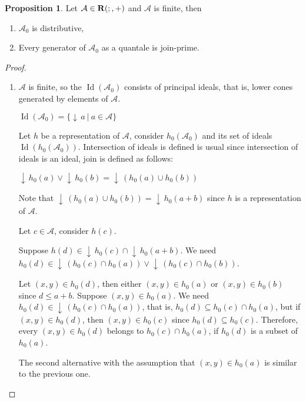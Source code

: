 \documentclass[a4paper]{article}
\theoremstyle{definition}
\theoremstyle{theorem}
\theoremstyle{proposition}
\newtheorem{proposition}{Proposition}
\theoremstyle{lemma}
\theoremstyle{ex}
\theoremstyle{corollary}
\theoremstyle{claim}
\newcommand{\down}[1]{\ensuremath{{\downarrow}\,#1}}
\begin{document}
\begin{proposition} \label{distr}
  Let $\mathcal{A} \in {\bf R}(;,+)$ and $\mathcal{A}$ is finite, then
  \begin{enumerate}
    \item $\mathcal{A}_0$ is distributive,
    \item Every generator of $\mathcal{A}_0$ as a quantale is join-prime.
  \end{enumerate}
\end{proposition}

\begin{proof}
$ $

  \begin{enumerate}
    \item
    $\mathcal{A}$ is finite, so the $\operatorname{Id}(\mathcal{A}_0)$ consists of principal ideals, that is, lower cones generated by elements of $\mathcal{A}$.

    \begin{center}
    $\operatorname{Id}(\mathcal{A}_0) = \{ \down{a} \: | \: a \in \mathcal{A} \}$
    \end{center}

    Let $h$ be a representation of $\mathcal{A}$, consider $h_0(\mathcal{A}_0)$ and its set of ideals $\operatorname{Id}(h_0(\mathcal{A}_0))$. Intersection of ideals is defined is usual since intersection of ideals is an ideal, join is defined as follows:

    \begin{center}
    $\down{h_0(a)} \vee \down{h_0(b)} = \down{(h_0(a) \cup h_0(b))}$
    \end{center}
    Note that $\down{(h_0(a) \cup h_0(b))} = \down{h_0(a + b)}$ since $h$ is a representation of $\mathcal{A}$.

    Let $c \in \mathcal{A}$, consider $h(c)$.

    Suppose $h(d) \in \down{h_0(c)} \cap \down{h_0(a + b)}$. We need $h_0(d) \in \down{(h_0(c) \cap h_0(a))} \vee \down{(h_0(c) \cap h_0(b))}$.


    Let $(x, y) \in h_0(d)$, then either $(x, y) \in h_0(a)$ or $(x, y) \in h_0(b)$ since $d \leq a + b$.
    Suppose $(x, y) \in h_0(a)$. We need $h_0(d) \in \down{(h_0(c) \cap h_0(a))}$, that is, $h_0(d) \subseteq h_0(c) \cap h_0(a)$, but if $(x, y) \in h_0(d)$, then $(x, y) \in h_0(c)$ since $h_0(d) \subseteq h_0(c)$. Therefore, every $(x, y) \in h_0(d)$ belongs to $h_0(c) \cap h_0(a)$, if $h_0(d)$ is a subset of $h_0(a)$.

    The second alternative with the assumption that $(x, y) \in h_0(a)$ is similar to the previous one.


\end{enumerate}
\end{proof}
\end{document}
